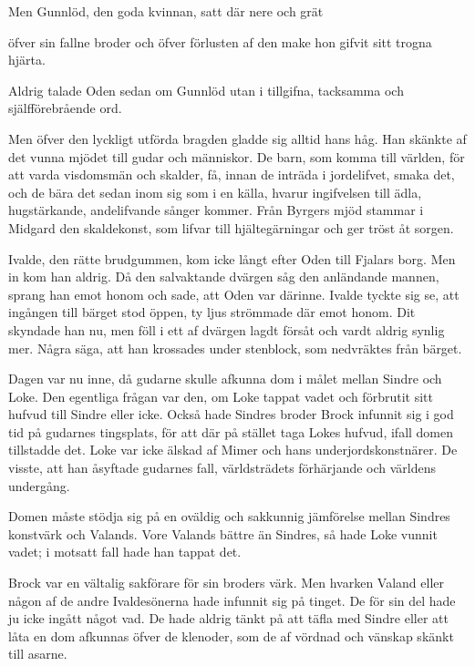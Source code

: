 Men Gunnlöd, den goda kvinnan, satt där nere och grät

öfver sin fallne broder och öfver förlusten af den make hon gifvit sitt
trogna hjärta.

Aldrig talade Oden sedan om Gunnlöd utan i tillgifna, tacksamma och
själfförebrående ord.

Men öfver den lyckligt utförda bragden gladde sig alltid hans håg. Han
skänkte af det vunna mjödet till gudar och människor. De barn, som komma
till världen, för att varda visdomsmän och skalder, få, innan de inträda
i jordelifvet, smaka det, och de bära det sedan inom sig som i en källa,
hvarur ingifvelsen till ädla, hugstärkande, andelifvande sånger kommer.
Från Byrgers mjöd stammar i Midgard den skaldekonst, som lifvar till
hjältegärningar och ger tröst åt sorgen.

Ivalde, den rätte brudgummen, kom icke långt efter Oden till Fjalars
borg. Men in kom han aldrig. Då den salvaktande dvärgen såg den
anländande mannen, sprang han emot honom och sade, att Oden var därinne.
Ivalde tyckte sig se, att ingången till bärget stod öppen, ty ljus
strömmade där emot honom. Dit skyndade han nu, men föll i ett af dvärgen
lagdt försåt och vardt aldrig synlig mer. Några säga, att han krossades
under stenblock, som nedvräktes från bärget.



Dagen var nu inne, då gudarne skulle afkunna dom i målet mellan Sindre
och Loke. Den egentliga frågan var den, om Loke tappat vadet och
förbrutit sitt hufvud till Sindre eller icke. Också hade Sindres broder
Brock infunnit sig i god tid på gudarnes tingsplats, för att där på
stället taga Lokes hufvud, ifall domen tillstadde det. Loke var icke
älskad af Mimer och hans underjordskonstnärer. De visste, att han
åsyftade gudarnes fall, världsträdets förhärjande och världens
undergång.

Domen måste stödja sig på en oväldig och sakkunnig jämförelse mellan
Sindres konstvärk och Valands. Vore
Valands
bättre än Sindres, så hade Loke vunnit vadet; i motsatt fall hade han
tappat det.

Brock var en vältalig sakförare för sin broders värk. Men hvarken Valand
eller någon af de andre Ivaldesönerna hade infunnit sig på tinget. De
för sin del hade ju icke ingått något vad. De hade aldrig tänkt på att
täfla med Sindre eller att låta en dom afkunnas öfver de klenoder, som
de af vördnad och vänskap skänkt till asarne.

